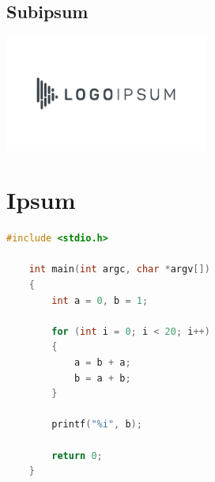 \lipsum[5]

\subsection{Subipsum}

\lipsum[1]

\begin{center}
    \includegraphics[width=0.5\textwidth]{lipsum_logo_2}
\end{center}

\lipsum[2]

\section{Ipsum}

\begin{lstlisting}[language=c, style=dhpaperdefault]
    #include <stdio.h>

    int main(int argc, char *argv[])
    {
        int a = 0, b = 1;
        
        for (int i = 0; i < 20; i++)
        {
            a = b + a;
            b = a + b;
        }

        printf("%i", b);

        return 0;
    }
\end{lstlisting}

\lipsum[2-4]